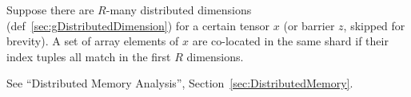 
Suppose there are $R$-many distributed dimensions (def~\ref{sec:gDistributedDimension}) for a certain tensor $x$ (or barrier $z$, skipped for brevity).
A set of array elements of $x$ are co-located in the same shard if their index tuples all match in the first $R$ dimensions.

See ``Distributed Memory Analysis'', Section~\ref{sec:DistributedMemory}.


